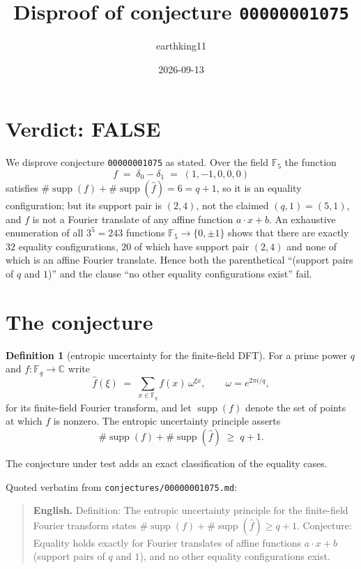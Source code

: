 \documentclass[11pt]{article}
\title{Disproof of conjecture \texttt{00000001075}}
\author{earthking11}
\date{2026-09-13}
\theoremstyle{definition}
\newtheorem{definition}[theorem]{Definition}
\theoremstyle{remark}
\newcommand{\F}{\mathbb{F}}
\newcommand{\supp}{\operatorname{supp}}
\newcommand{\fh}{\widehat{f}}
\begin{document}
\maketitle

\section*{Verdict: FALSE}

We disprove conjecture \texttt{00000001075} as stated. Over the field $\F_5$
the function
\[
f \;=\; \delta_0-\delta_1 \;=\; (1,-1,0,0,0)
\]
satisfies $\#\supp(f)+\#\supp(\fh)=6=q+1$, so it is an equality
configuration; but its support pair is $(2,4)$, not the claimed $(q,1)=(5,1)$,
and $f$ is not a Fourier translate of any affine function $a\cdot x+b$. An
exhaustive enumeration of all $3^5=243$ functions $\F_5\to\{0,\pm1\}$ shows
that there are exactly $32$ equality configurations, $20$ of which have
support pair $(2,4)$ and none of which is an affine Fourier translate. Hence
both the parenthetical ``(support pairs of $q$ and $1$)'' and the clause ``no
other equality configurations exist'' fail.

\section{The conjecture}

\begin{definition}[entropic uncertainty for the finite-field DFT]
For a prime power $q$ and $f:\F_q\to\mathbb{C}$ write
\[
\fh(\xi) \;=\; \sum_{x\in\F_q} f(x)\,\omega^{\xi x},
\qquad \omega = e^{2\pi i/q},
\]
for its finite-field Fourier transform, and let $\supp(f)$ denote the set of
points at which $f$ is nonzero. The entropic uncertainty principle asserts
\begin{equation}\label{eq:unc}
\#\supp(f) + \#\supp(\fh) \;\ge\; q+1 .
\end{equation}
\end{definition}

The conjecture under test adds an exact classification of the equality cases.

Quoted verbatim from \texttt{conjectures/00000001075.md}:

\begin{quote}
\textbf{English.} Definition: The entropic uncertainty principle for the
finite-field Fourier transform states $\#\supp(f) + \#\supp(\fh) \ge q+1$.
Conjecture: Equality holds exactly for Fourier translates of affine functions
$a\cdot x + b$ (support pairs of $q$ and $1$), and no other equality
configurations exist.
\end{quote}
\end{document}
